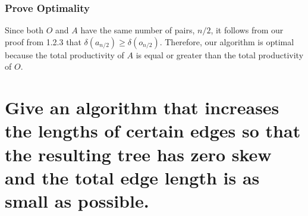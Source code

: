 \documentclass[11pt]{scrartcl}
\begin{document}
\subsubsection{
	Prove Optimality
}
Since both $O$ and $A$ have the same number of pairs, $n/2$, it follows from our proof
from 1.2.3 that $\delta(a_{n/2}) \geq \delta(o_{n/2})$. Therefore, our algorithm is
optimal because
the total productivity of $A$ is equal or greater than the total productivity of
$O$.

\section{
  Give an algorithm that increases the lengths of certain edges so that
  the resulting tree has zero skew and the total edge length is as small as
  possible.
 }
\end{document}
